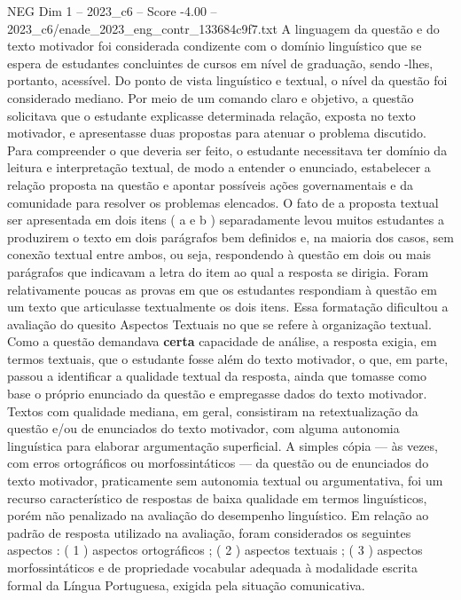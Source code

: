 \begin{textsample}{NEG Dim 1 – 2023\_c6 – Score -4.00 – 2023\_c6/enade\_2023\_eng\_contr\_133684c9f7.txt}
A linguagem da questão e do texto motivador foi considerada condizente com o domínio linguístico que se espera de estudantes concluintes de cursos em nível de graduação, sendo -lhes, portanto, acessível.
Do ponto de vista linguístico e textual, o nível da questão foi considerado mediano.
Por meio de um comando claro e objetivo, a questão solicitava que o estudante explicasse determinada relação, exposta no texto motivador, e apresentasse duas propostas para atenuar o problema discutido.
Para compreender o que deveria ser feito, o estudante necessitava ter domínio da leitura e interpretação textual, de modo a entender o enunciado, estabelecer a relação proposta na questão e apontar possíveis ações governamentais e da comunidade para resolver os problemas elencados.
O fato de a proposta textual ser apresentada em dois itens ( a e b ) separadamente levou muitos estudantes a produzirem o texto em dois parágrafos bem definidos e, na maioria dos casos, sem conexão textual entre ambos, ou seja, respondendo à questão em dois ou mais parágrafos que indicavam a letra do item ao qual a resposta se dirigia.
Foram relativamente poucas as provas em que os estudantes respondiam à questão em um texto que articulasse textualmente os dois itens.
Essa formatação dificultou a avaliação do quesito Aspectos Textuais no que se refere à organização textual.
Como a questão demandava \textbf{certa} capacidade de análise, a resposta exigia, em termos textuais, que o estudante fosse além do texto motivador, o que, em parte, passou a identificar a qualidade textual da resposta, ainda que tomasse como base o próprio enunciado da questão e empregasse dados do texto motivador.
Textos com qualidade mediana, em geral, consistiram na retextualização da questão e/ou de enunciados do texto motivador, com alguma autonomia linguística para elaborar argumentação superficial.
A simples cópia — às vezes, com erros ortográficos ou morfossintáticos — da questão ou de enunciados do texto motivador, praticamente sem autonomia textual ou argumentativa, foi um recurso característico de respostas de baixa qualidade em termos linguísticos, porém não penalizado na avaliação do desempenho linguístico.
Em relação ao padrão de resposta utilizado na avaliação, foram considerados os seguintes aspectos : ( 1 ) aspectos ortográficos ; ( 2 ) aspectos textuais ; ( 3 ) aspectos morfossintáticos e de propriedade vocabular adequada à modalidade escrita formal da Língua Portuguesa, exigida pela situação comunicativa.

\end{textsample}

